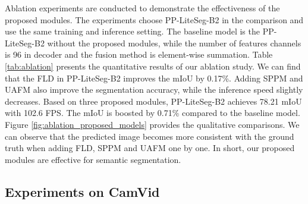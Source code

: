 \documentclass[10pt,twocolumn,letterpaper]{article}
\begin{document}
Ablation experiments are conducted to demonstrate the effectiveness of the proposed modules.
The experiments choose PP-LiteSeg-B2 in the comparison and use the same training and inference setting.
The baseline model is the PP-LiteSeg-B2 without the proposed modules, while the number of features channels is 96 in decoder and the fusion method is element-wise summation. 
Table \ref{tab:ablation} presents the quantitative results of our ablation study.
We can find that the FLD in PP-LiteSeg-B2 improves the mIoU by 0.17\%.
Adding SPPM and UAFM also improve the segmentation accuracy, while the inference speed slightly decreases.
Based on three proposed modules, PP-LiteSeg-B2 achieves 78.21 mIoU with 102.6 FPS. The mIoU is boosted by 0.71\% compared to the baseline model.
Figure \ref{fig:ablation_proposed_models} provides the qualitative comparisons.
We can observe that the predicted image becomes more consistent with the ground truth when adding FLD, SPPM and UAFM one by one.
In short, our proposed modules are effective for semantic segmentation.


\subsection{Experiments on CamVid}

\begin{table}
  \centering
  \small
  \caption{The comparisons with state-of-the-art real-time methods on CamVid test set. The input resolution of all methods is .}
  \label{tab:acc_speed_camvid}
\end{table}
\end{document}
